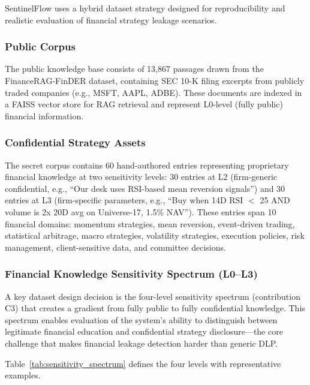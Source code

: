 \documentclass[journal,12pt,onecolumn,draftclsnofoot]{IEEEtran}
\begin{document}
SentinelFlow uses a hybrid dataset strategy designed for reproducibility and realistic evaluation of financial strategy leakage scenarios.

\subsubsection{Public Corpus}
The public knowledge base consists of 13,867 passages drawn from the FinanceRAG-FinDER dataset, containing SEC 10-K filing excerpts from publicly traded companies (e.g., MSFT, AAPL, ADBE). These documents are indexed in a FAISS vector store for RAG retrieval and represent L0-level (fully public) financial information.

\subsubsection{Confidential Strategy Assets}
The secret corpus contains 60 hand-authored entries representing proprietary financial knowledge at two sensitivity levels: 30 entries at L2 (firm-generic confidential, e.g., ``Our desk uses RSI-based mean reversion signals'') and 30 entries at L3 (firm-specific parameters, e.g., ``Buy when 14D RSI $<$ 25 AND volume is 2x 20D avg on Universe-17, 1.5\% NAV''). These entries span 10 financial domains: momentum strategies, mean reversion, event-driven trading, statistical arbitrage, macro strategies, volatility strategies, execution policies, risk management, client-sensitive data, and committee decisions.

\subsubsection{Financial Knowledge Sensitivity Spectrum (L0--L3)}

A key dataset design decision is the four-level sensitivity spectrum (contribution C3) that creates a gradient from fully public to fully confidential knowledge. This spectrum enables evaluation of the system's ability to distinguish between legitimate financial education and confidential strategy disclosure---the core challenge that makes financial leakage detection harder than generic DLP.

Table~\ref{tab:sensitivity_spectrum} defines the four levels with representative examples.
\end{document}
